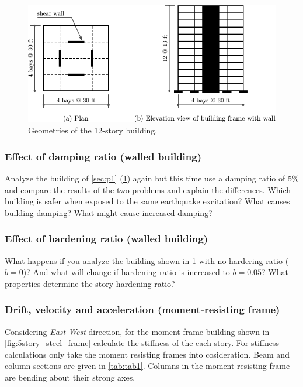\documentclass{simcenterdocumentation}
\begin{document}
\begin{figure}[H]
	\centering \includegraphics[scale=1]{plan.pdf}
	\caption{Geometries of the 12-story building.}
	\label{fig:plan}
\end{figure} 


\subsubsection{Effect of damping ratio (walled building)} Analyze the building of \ref{sec:p1} (\cref{fig:plan}) again but this time use a damping ratio of 5\% and compare the results of the two problems and explain the differences. Which building is safer when exposed to the same earthquake excitation? What causes building damping? What might cause increased damping?

\subsubsection{Effect of hardening ratio (walled building)} What happens if you analyze the building shown in \cref{fig:plan} with no hardering ratio ($b = 0$)? And what will change if hardening ratio is increased to $b = 0.05$? What properties determine the story hardening ratio?


\subsubsection{Drift, velocity and acceleration (moment-resisting frame)} Considering \textsl{East-West} direction, for the moment-frame building shown in \cref{fig:5story_steel_frame} calculate the stiffness of the each story. For stiffness calculations only take the moment resisting frames into cosideration. Beam and column sections are given in \cref{tab:tab1}. Columns in the moment resisting frame are bending about their strong axes.
\end{document}
